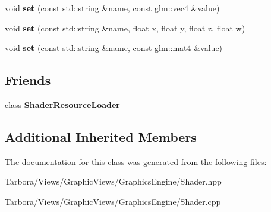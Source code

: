 \begin{DoxyCompactItemize}
void {\bfseries set} (const std\+::string \&name, const glm\+::vec4 \&value)
\item 
\mbox{\label{classTarbora_1_1Shader_abed2a11cb0195b5ff185f8c587ccbc75}} 
void {\bfseries set} (const std\+::string \&name, float x, float y, float z, float w)
\item 
\mbox{\label{classTarbora_1_1Shader_aaf8d476fced34ebedb2c3d967dfc0432}} 
void {\bfseries set} (const std\+::string \&name, const glm\+::mat4 \&value)
\end{DoxyCompactItemize}
\subsection*{Friends}
\begin{DoxyCompactItemize}
\item 
\mbox{\label{classTarbora_1_1Shader_af5dec6dcc9516c55d69a0f0503b73135}} 
class {\bfseries Shader\+Resource\+Loader}
\end{DoxyCompactItemize}
\subsection*{Additional Inherited Members}


The documentation for this class was generated from the following files\+:\begin{DoxyCompactItemize}
\item 
Tarbora/\+Views/\+Graphic\+Views/\+Graphics\+Engine/Shader.\+hpp\item 
Tarbora/\+Views/\+Graphic\+Views/\+Graphics\+Engine/Shader.\+cpp\end{DoxyCompactItemize}
